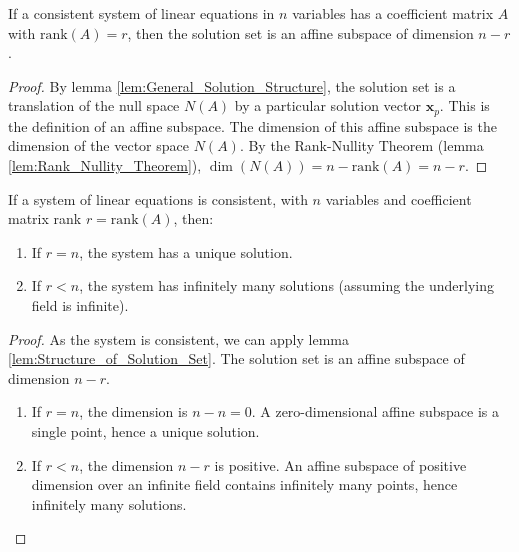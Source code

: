 \begin{lemma}
    \label{lem:Structure_of_Solution_Set}
    If a consistent system of linear equations in $n$ variables has a coefficient matrix $A$ with $\text{rank}(A) = r$, then the solution set is an affine subspace of dimension $n-r$.
\end{lemma}

\begin{proof}
    By lemma \ref{lem:General_Solution_Structure}, the solution set is a translation of the null space $N(A)$ by a particular solution vector $\mathbf{x}_p$. This is the definition of an affine subspace. The dimension of this affine subspace is the dimension of the vector space $N(A)$. By the Rank-Nullity Theorem (lemma \ref{lem:Rank_Nullity_Theorem}), $\dim(N(A)) = n - \text{rank}(A) = n-r$.
\end{proof}

\begin{theorem}
    \label{thm:Rouche-Capelli_Number_of_Solutions}
    If a system of linear equations is consistent, with $n$ variables and coefficient matrix rank $r = \text{rank}(A)$, then:
    \begin{enumerate}
        \item If $r=n$, the system has a unique solution.
        \item If $r<n$, the system has infinitely many solutions (assuming the underlying field is infinite).
    \end{enumerate}
\end{theorem}

\begin{proof}
    As the system is consistent, we can apply lemma \ref{lem:Structure_of_Solution_Set}. The solution set is an affine subspace of dimension $n-r$.
    \begin{enumerate}
        \item If $r=n$, the dimension is $n-n=0$. A zero-dimensional affine subspace is a single point, hence a unique solution.
        \item If $r<n$, the dimension $n-r$ is positive. An affine subspace of positive dimension over an infinite field contains infinitely many points, hence infinitely many solutions.
    \end{enumerate}
\end{proof}